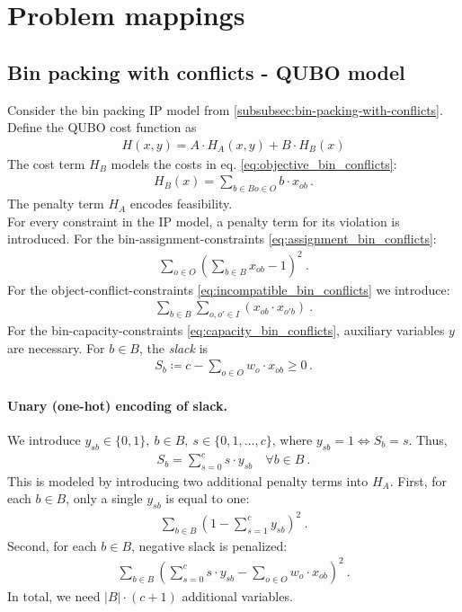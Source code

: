 \section{Problem mappings}

\subsection{Bin packing with conflicts - QUBO model}

Consider the bin packing IP model from \cref{subsubsec:bin-packing-with-conflicts}.\\
Define the QUBO cost function as
\begin{align}\label{eq:costfunction}
	H(x,y) = A\cdot H_A(x,y) + B\cdot H_B(x)
\end{align}
The cost term $H_B$ models the costs in eq. \eqref{eq:objective_bin_conflicts}:
\begin{align}
	H_B(x) = \sum_{b\in B o \in O}b\cdot x_{ob}\,.
\end{align}
The penalty term $H_A$ encodes feasibility.\\
For every constraint in the IP model, a penalty term for its violation is introduced.
For the bin-assignment-constraints \eqref{eq:assignment_bin_conflicts}:
\begin{align}
	\sum_{o\in O}\left(\sum_{b\in B}x_{ob}-1\right)^2\ .
\end{align}
For the object-conflict-constraints \eqref{eq:incompatible_bin_conflicts} we introduce:
\begin{align}
	\sum_{b\in B}\sum_{o,o'\in I}\left(x_{ob}\cdot x_{o'b}\right)\ .
\end{align}
For the bin-capacity-constraints \eqref{eq:capacity_bin_conflicts}, auxiliary variables $y$ are necessary.
For $b \in B$, the \emph{slack}  is
\begin{align}
	S_b \coloneqq c-\sum_{ o \in O}w_o\cdot x_{ob} \geq 0\,.
\end{align}

\paragraph{Unary (one-hot) encoding of slack.}
We introduce $y_{sb}\in \{0,1\},\ b\in B,\ s \in \{0,1,\dots,c\}$, where
$y_{sb} = 1 \Leftrightarrow S_b = s$.
Thus,
\begin{align}
	S_b = \sum_{s= 0}^{c}s\cdot y_{sb} \quad\forall b\in B\ .
\end{align}
This is modeled by introducing two additional penalty terms into $H_A$.
First, for each $b\in B$, only a single $y_{sb}$ is equal to one:
\begin{align}
	\sum_{b \in B}\left(1 - \sum_{s= 1}^{c}y_{sb}\right)^2\ .
\end{align}
Second, for each $b\in B$, negative slack is penalized:
\begin{align}
	\sum_{b \in B}\left(\sum_{s= 0}^{c}s\cdot y_{sb} - \sum_{o\in O} w_o\cdot x_{ob} \right)^2\ .
\end{align}
In total, we need $|B| \cdot (c+1)$ additional variables.

